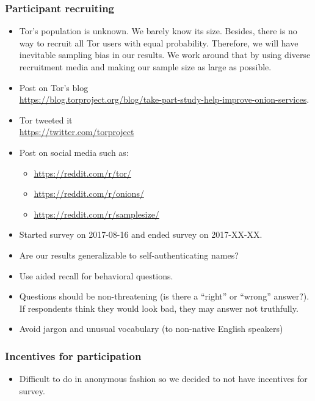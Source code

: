 \subsubsection{Participant recruiting}
\begin{itemize}
    \item Tor's population is unknown.  We barely know its size.  Besides, there
        is no way to recruit all Tor users with equal probability.  Therefore,
        we will have inevitable sampling bias in our results.  We work around
        that by using diverse recruitment media and making our sample size as
        large as possible.
    \item Post on Tor's blog\\\url{https://blog.torproject.org/blog/take-part-study-help-improve-onion-services}.
    \item Tor tweeted it\\\url{https://twitter.com/torproject}
    \item Post on social media such as:
        \begin{itemize}
            \item \url{https://reddit.com/r/tor/}
            \item \url{https://reddit.com/r/onions/}
            \item \url{https://reddit.com/r/samplesize/}
        \end{itemize}
    \item Started survey on 2017-08-16 and ended survey on 2017-XX-XX.
\end{itemize}

\begin{itemize}
    \item Are our results generalizable to self-authenticating names?
    \item Use aided recall for behavioral questions.
    \item Questions should be non-threatening (is there a ``right'' or ``wrong''
        answer?).  If respondents think they would
        look bad, they may answer not truthfully.
    \item Avoid jargon and unusual vocabulary (to non-native English speakers)
\end{itemize}

\subsubsection{Incentives for participation}
\begin{itemize}
    \item Difficult to do in anonymous fashion so we decided to not have
        incentives for survey.
\end{itemize}

